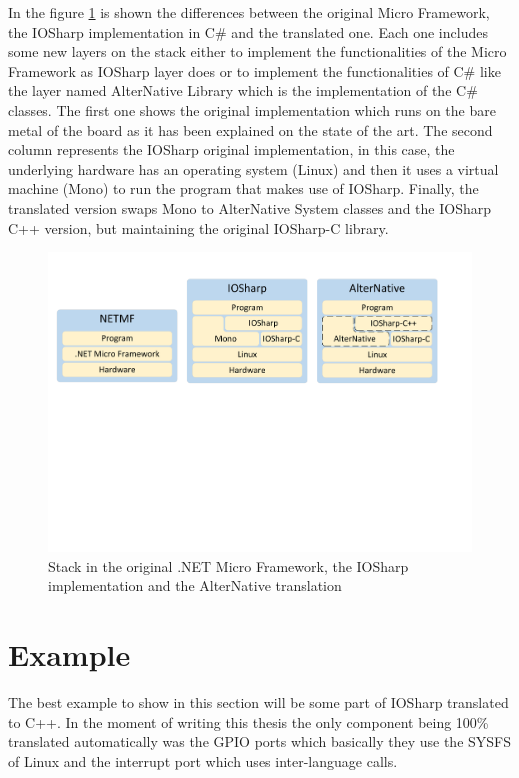 In the figure \ref{fig:AN-Example-IOSharp} is shown the differences between the original Micro Framework, the IOSharp implementation in C\# and the translated one. Each one includes some new layers on the stack either to implement the functionalities of the Micro Framework as IOSharp layer does or to implement the functionalities of C\# like the layer named AlterNative Library which is the implementation of the C\# classes. The first one shows the original implementation which runs on the bare metal of the board as it has been explained on the state of the art. The second column represents the IOSharp original implementation, in this case, the underlying hardware has an operating system (Linux) and then it uses a virtual machine (Mono) to run the program that makes use of IOSharp. Finally, the translated version swaps Mono to AlterNative System classes and the IOSharp C++ version, but maintaining the original IOSharp-C library.

\begin{figure}[H]\begin{center}
 \centering
  \captionsetup{justification=centering}
  \includegraphics[width=1\textwidth]{pictures/alternative/transformations-iosharp}
  \caption{Stack in the original .NET Micro Framework, the IOSharp implementation and the AlterNative translation\label{fig:AN-Example-IOSharp}}
\end{center}\end{figure}

\section{Example}\label{SS:AN-Process-Example}
The best example to show in this section will be some part of IOSharp translated to C++. In the moment of writing this thesis the only component being 100\% translated automatically was the GPIO ports which basically they use the \gls{SYSFS} of Linux and the interrupt port which uses inter-language calls.

